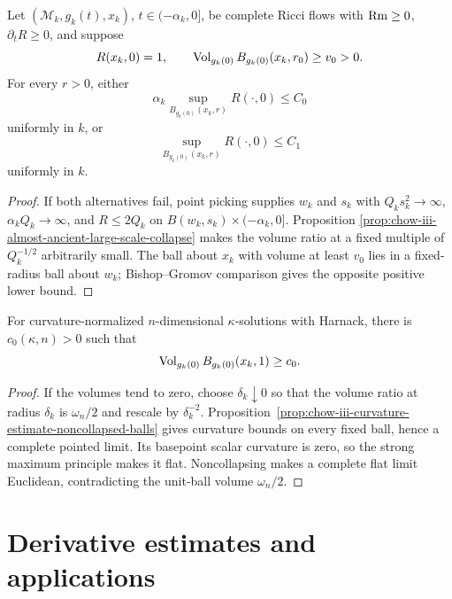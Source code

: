 \begin{lemma}
\label{lem:chow-iii-bounded-curvature-bounded-distance}
Let $(\mathcal M_k,g_k(t),x_k)$, $t\in(-\alpha_k,0]$, be complete Ricci
flows with $\operatorname{Rm}\ge0$, $\partial_tR\ge0$, and suppose
\[
 R(x_k,0)=1,
 \qquad \operatorname{Vol}_{g_k(0)}B_{g_k(0)}(x_k,r_0)\ge v_0>0.
\]
For every $r>0$, either
\[
 \alpha_k\sup_{B_{g_k(0)}(x_k,r)}R(\cdot,0)\le C_0
\]
uniformly in $k$, or
\[
 \sup_{B_{g_k(0)}(x_k,r)}R(\cdot,0)\le C_1
\]
uniformly in $k$.
\end{lemma}
\begin{proof}
If both alternatives fail, point picking supplies $w_k$ and $s_k$ with
$Q_ks_k^2\to\infty$, $\alpha_kQ_k\to\infty$, and $R\le2Q_k$ on
$B(w_k,s_k)\times(-\alpha_k,0]$.  Proposition
\ref{prop:chow-iii-almost-ancient-large-scale-collapse} makes the volume
ratio at a fixed multiple of $Q_k^{-1/2}$ arbitrarily small.  The ball about
$x_k$ with volume at least $v_0$ lies in a fixed-radius ball about $w_k$;
Bishop--Gromov comparison gives the opposite positive lower bound.
\end{proof}

\begin{claim}
\label{clm:chow-iii-unit-ball-volume-lower-bound}
For curvature-normalized $n$-dimensional $\kappa$-solutions with Harnack,
there is $c_0(\kappa,n)>0$ such that
\[
 \operatorname{Vol}_{g_k(0)}B_{g_k(0)}(x_k,1)\ge c_0.
\]
\end{claim}
\begin{proof}
If the volumes tend to zero, choose $\delta_k\downarrow0$ so that the volume
ratio at radius $\delta_k$ is $\omega_n/2$ and rescale by $\delta_k^{-2}$.
Proposition~\ref{prop:chow-iii-curvature-estimate-noncollapsed-balls} gives
curvature bounds on every fixed ball, hence a complete pointed limit.  Its
basepoint scalar curvature is zero, so the strong maximum principle makes it
flat.  Noncollapsing makes a complete flat limit Euclidean, contradicting
the unit-ball volume $\omega_n/2$.
\end{proof}

\section{Derivative estimates and applications}

